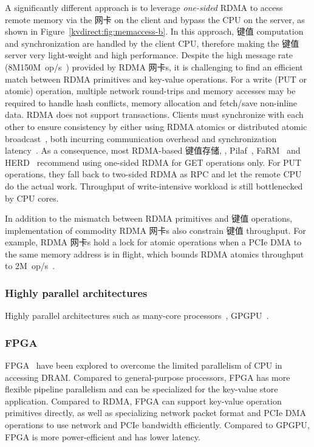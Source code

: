{A significantly different approach is to leverage \textit{one-sided} RDMA to access remote memory via the 网卡 on the client and bypass the CPU on the server, as shown in Figure~\ref{kvdirect:fig:memaccess-b}.
In this approach, 键值 computation and synchronization are handled by the client CPU, therefore making the 键值 server very light-weight and high performance.
Despite the high message rate (8M\approx150M~op/s~\cite{kalia2016design}) provided by RDMA 网卡s, it is challenging to find an efficient match between RDMA primitives and key-value operations.
For a write (PUT or atomic) operation, multiple network round-trips and memory accesses may be required to handle hash conflicts, memory allocation and fetch/save non-inline data.
RDMA does not support transactions. Clients must synchronize with each other to ensure consistency by either using RDMA atomics or distributed atomic broadcast~\cite{szepesi2014designing}, both incurring communication overhead and synchronization latency~\cite{mitchell2013using, dragojevic2014farm}.
As a consequence, most RDMA-based 键值存储, \eg, Pilaf~\cite{mitchell2013using}, FaRM~\cite{dragojevic2014farm} and HERD~\cite{kalia2014using} recommend using one-sided RDMA for GET operations only. For PUT operations, they fall back to two-sided RDMA as RPC and let the remote CPU do the actual work. Throughput of write-intensive workload is still bottlenecked by CPU cores.

In addition to the mismatch between RDMA primitives and 键值 operations, implementation of commodity RDMA 网卡s also constrain 键值 throughput. For example, RDMA 网卡s hold a lock for atomic operations when a PCIe DMA to the same memory address is in flight, which bounds RDMA atomics throughput to \approx2M~op/s~\cite{kalia2016design}.

\subsubsection{Highly parallel architectures}

Highly parallel architectures such as many-core processors~\cite{berezecki2011many}, GPGPU~\cite{zhang2015mega}.

\subsubsection{FPGA}

FPGA~\cite{istvan2013flexible, chalamalasetti2013fpga, maohardware, lavasani2014fpga, istvan2015hash, istvan2016consensus, kvs-openpower, istvan2015hash, sidler2015scalable, blott2015scaling} have been explored to overcome the limited parallelism of CPU in accessing DRAM.
Compared to general-purpose processors, FPGA has more flexible pipeline parallelism and can be specialized for the key-value store application.
Compared to RDMA, FPGA can support key-value operation primitives directly, as well as specializing network packet format and PCIe DMA operations to use network and PCIe bandwidth efficiently.
Compared to GPGPU, FPGA is more power-efficient and has lower latency.

}
